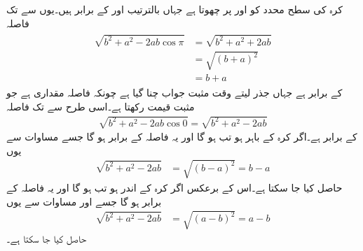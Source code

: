 کرہ کی سطح  محدد کو  اور   پر چھوتا ہے جہاں  بالترتیب  اور  کے برابر ہیں۔یوں  سے  تک فاصلہ
\begin{gather}
\begin{aligned}\label{مساوات_کولمب_کرہ_مثبت_محدد}
\sqrt{b^2+a^2-2 ab \cos \pi}&=\sqrt{b^2+a^2+2 ab}\\
&=\sqrt{(b+a)^2}\\
&=b+a
\end{aligned}
\end{gather}
کے برابر ہے جہاں جذر لیتے وقت مثبت جواب چنا گیا ہے چونکہ فاصلہ مقداری ہے جو مثبت قیمت رکھتا ہے۔اسی طرح  سے  تک فاصلہ
\begin{align}\label{مساوات_کولمب_کرہ_مثبت_محدد_الف}
\sqrt{b^2+a^2-2 ab \cos 0}=\sqrt{b^2+a^2-2 ab}
\end{align}
کے برابر ہے۔اگر  کرہ کے باہر ہو تب  ہو گا اور یہ فاصلہ  کے برابر ہو گا جسے  مساوات  سے یوں
\begin{align}\label{مساوات_کولمب_کرہ_مثبت_محدد_ب}
\sqrt{b^2+a^2-2 ab}&=\sqrt{(b-a)^2}=b-a
\end{align}
حاصل کیا جا سکتا ہے۔اس کے برعکس اگر  کرہ کے اندر ہو تب  ہو گا اور یہ فاصلہ  کے برابر ہو گا جسے  اور مساوات  سے یوں
\begin{align}\label{مساوات_کولمب_کرہ_مثبت_محدد_پ}
\sqrt{b^2+a^2-2 ab}&=\sqrt{(a-b)^2}=a-b
\end{align}
حاصل کیا جا سکتا ہے۔

